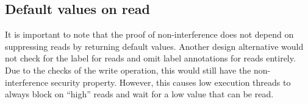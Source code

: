 \documentclass[10pt,preprint]{sigplanconf}
\newcommand{\arrayStretch}{1.28}
\renewcommand{\t}[1]{~\text{#1}~}
\begin{document}





\subsection{Default values on read}

It is important to note that the proof of non-interference does not depend on suppressing reads by returning default values.  Another design alternative would not check for the label for reads and omit label annotations for reads entirely.  Due to the checks of the write operation, this would still have the non-interference security property.  However, this causes low execution threads to always block on ``high'' reads and wait for a low value that can be read.
\end{document}
